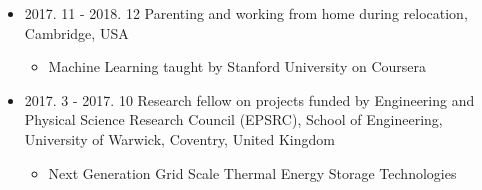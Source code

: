 \documentclass[letterpaper]{article}
\begin{document}
\begin{itemize}
\begin{itemize}
	\end{itemize}
\item 2017. 11 - 2018. 12 \hspace{2pt} Parenting and working from home during relocation, Cambridge, USA
		\begin{itemize}
		\item Machine Learning taught by Stanford University on Coursera
		\end{itemize}		
\item 2017. 3 - 2017. 10  \hspace{2pt} Research fellow on projects funded by Engineering and Physical Science Research Council (EPSRC), School of Engineering, University of Warwick, Coventry, United Kingdom
		\begin{itemize}
		\item Next Generation Grid Scale Thermal Energy Storage Technologies


\end{itemize}
\end{itemize}
\end{document}
